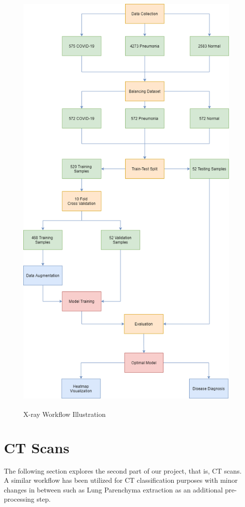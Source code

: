 \begin{figure}[H]
	\centering
	\includegraphics[width=13cm, height= 22.5cm]{Images/X-ray Workflow.png}
	\caption{\small X-ray Workflow Illustration}
	\label{fig:Xray Illustration}
\end{figure}

\section{CT Scans}
The following section explores the second part of our project, that is, CT scans. A similar workflow has been utilized for CT classification purposes with minor changes in between such as Lung Parenchyma extraction as an additional pre-processing step.

